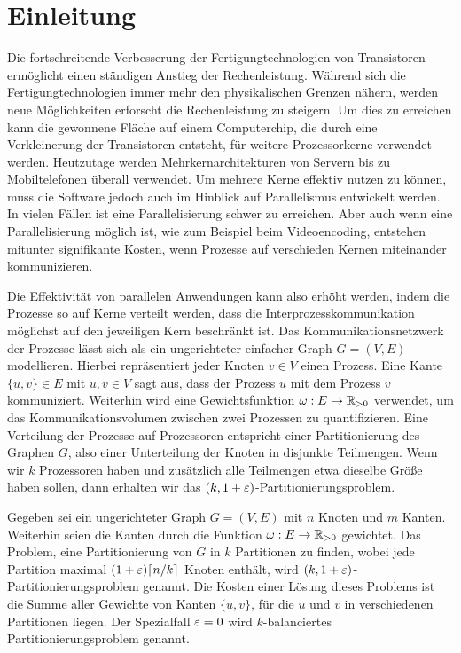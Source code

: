 
\chapter{Einleitung}\label{chapter:introduction}
Die fortschreitende Verbesserung der Fertigungtechnologien von Transistoren ermöglicht einen ständigen Anstieg der Rechenleistung.
Während sich die Fertigungtechnologien immer mehr den physikalischen Grenzen nähern, werden neue Möglichkeiten erforscht die Rechenleistung zu steigern.
Um dies zu erreichen kann die gewonnene Fläche auf einem Computerchip, die durch eine Verkleinerung der Transistoren entsteht, für weitere Prozessorkerne verwendet werden.
Heutzutage werden Mehrkernarchitekturen von Servern bis zu Mobiltelefonen überall verwendet.
Um mehrere Kerne effektiv nutzen zu können, muss die Software jedoch auch im Hinblick auf Parallelismus entwickelt werden.
In vielen Fällen ist eine Parallelisierung schwer zu erreichen.
Aber auch wenn eine Parallelisierung möglich ist, wie zum Beispiel beim Videoencoding, entstehen mitunter signifikante Kosten, wenn Prozesse auf verschieden Kernen miteinander kommunizieren.~\cite{LTS09}

Die Effektivität von parallelen Anwendungen kann also erhöht werden, indem die Prozesse so auf Kerne verteilt werden, dass die Interprozesskommunikation möglichst auf den jeweiligen Kern beschränkt ist.
Das Kommunikationsnetzwerk der Prozesse lässt sich als ein ungerichteter einfacher Graph $G = (V, E)$ modellieren.
Hierbei repräsentiert jeder Knoten $v \in V$ einen Prozess.
Eine Kante $\{u, v\} \in E$ mit $u, v \in V$ sagt aus, dass der Prozess $u$ mit dem Prozess $v$ kommuniziert.
Weiterhin wird eine Gewichtsfunktion $\omega : E \rightarrow \mathbb{R}_{>0}$ verwendet, um das Kommunikationsvolumen zwischen zwei Prozessen zu quantifizieren.
Eine Verteilung der Prozesse auf Prozessoren entspricht einer Partitionierung des Graphen $G$, also einer Unterteilung der Knoten in disjunkte Teilmengen.
Wenn wir $k$ Prozessoren haben und zusätzlich alle Teilmengen etwa dieselbe Größe haben sollen, dann erhalten wir das $(k, 1 + \varepsilon)$\hyp Partitionierungsproblem.

\begin{defn}
    Gegeben sei ein ungerichteter Graph $G = (V, E)$ mit $n$ Knoten und $m$ Kanten.
    Weiterhin seien die Kanten durch die Funktion $\omega : E \rightarrow \mathbb{R}_{> 0}$ gewichtet.
    Das Problem, eine Partitionierung von $G$ in $k$ Partitionen zu finden, wobei jede Partition maximal $(1 + \varepsilon) \lceil n/k\rceil$ Knoten enthält, wird $(k,1 + \varepsilon)$\hyp Partitionierungsproblem genannt.
    Die Kosten einer Lösung dieses Problems ist die Summe aller Gewichte von Kanten $\{u, v\}$, für die $u$ und $v$ in verschiedenen Partitionen liegen.
    Der Spezialfall $\varepsilon=0$ wird $k$\hyp balanciertes Partitionierungsproblem genannt.
\end{defn}

